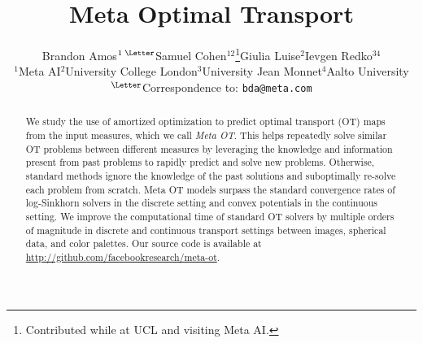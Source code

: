 \documentclass{article}
\begin{document}
\title{Meta Optimal Transport}
\author{Brandon Amos$^{1\;\textrm{\normalfont\Letter}}$\qquad {}Samuel Cohen$^{12}$\thanks{Contributed while at UCL and visiting Meta AI.}\qquad Giulia Luise$^2$\qquad Ievgen Redko$^{34}$ \\
  $^1$Meta AI\quad $^2$University College London\quad $^3$University Jean Monnet\quad $^4$Aalto University \\
  $^\textrm{\Letter}$\hspace{0.5mm}Correspondence to: \texttt{bda@meta.com}}
\maketitle

\begin{abstract}
  We study the use of amortized optimization to predict optimal transport (OT) maps
  from the input measures, which we call \emph{Meta OT}.
  This helps repeatedly solve similar OT problems between different
  measures by leveraging the knowledge and information present
  from past problems to rapidly predict and solve new problems.
  Otherwise, standard methods ignore the knowledge of the
  past solutions and suboptimally re-solve each problem from scratch.
  Meta OT models surpass the standard
  convergence rates of log-Sinkhorn solvers in the discrete setting
  and convex potentials in the continuous setting.
  We improve the computational time of standard OT solvers
  by multiple orders of magnitude in discrete and continuous
  transport settings between images, spherical data, and color palettes.
  Our source code is available at \url{http://github.com/facebookresearch/meta-ot}.
\end{abstract}
\end{document}
